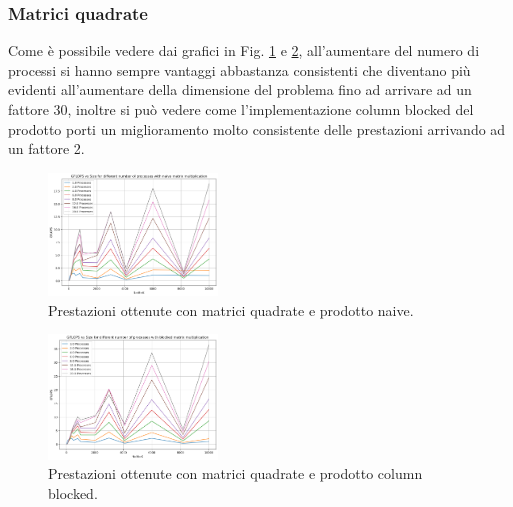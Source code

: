 \documentclass[conference]{IEEEtran}
\begin{document}
\subsubsection{Matrici quadrate}
Come è possibile vedere dai grafici in Fig. \ref{fig:square_matrix_naive} e \ref{fig:square_matrix_blocked}, all'aumentare del numero di processi si hanno sempre vantaggi abbastanza consistenti che diventano più evidenti all'aumentare della dimensione del problema fino ad arrivare ad un fattore 30, inoltre si può vedere come l'implementazione column blocked del prodotto porti un miglioramento molto consistente delle prestazioni arrivando ad un fattore 2.
\begin{figure}[H]
    \centering
    \includegraphics[width=0.4\textwidth]{resources/quadrate_naive.png}
    \caption{Prestazioni ottenute con matrici quadrate e prodotto naive.}
    \label{fig:square_matrix_naive}
\end{figure}
\begin{figure}[H]
    \centering
    \includegraphics[width=0.4\textwidth]{resources/quadrate_blocked.png}
    \caption{Prestazioni ottenute con matrici quadrate e prodotto column blocked.}
    \label{fig:square_matrix_blocked}
\end{figure}
\end{document}
